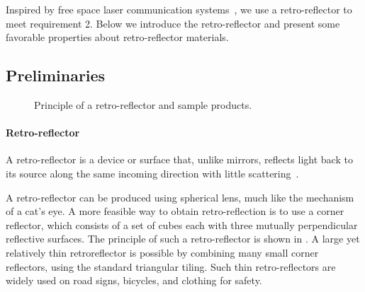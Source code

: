 Inspired by free space laser communication systems~\cite{mrr}, we use a retro-reflector to meet requirement 2. Below we introduce the retro-reflector and present some favorable properties about retro-reflector materials. 



\subsection{Preliminaries}

\begin{figure}[tb]
    \centering
     \hfill
     \caption{\label{fig:retro-reflector}Principle of a retro-reflector and sample products.}
  \end{figure}

\paragraph{Retro-reflector} 
A retro-reflector is a device or surface that, unlike mirrors, reflects light back to its source along the same incoming direction with little scattering~\cite{rr}. 

A retro-reflector can be produced using spherical lens, much like the mechanism of a cat's eye. A more feasible way to obtain retro-reflection is to use a corner reflector, which consists of a set of cubes each with three mutually perpendicular reflective surfaces. The principle of such a retro-reflector is shown in . A large yet relatively thin retroreflector is possible by combining many small corner reflectors, using the standard triangular tiling. Such thin retro-reflectors are widely used on road signs, bicycles, and clothing for safety.  


